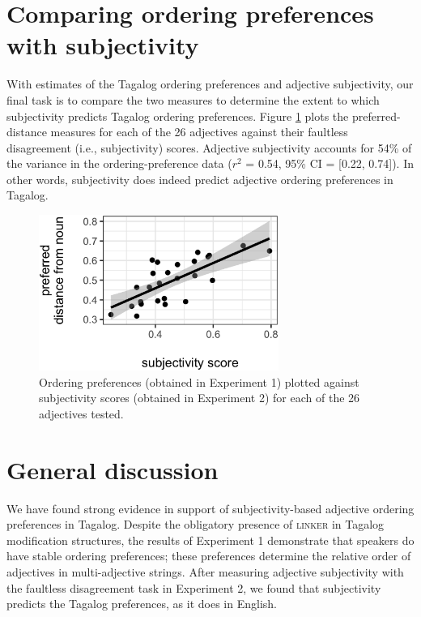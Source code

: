 \documentclass[12pt,letterpaper]{article}
\begin{document}
\section{Comparing ordering preferences with subjectivity} \label{comparison}

With estimates of the Tagalog ordering preferences and adjective subjectivity, our final task is to compare the two measures to determine the extent to which subjectivity predicts Tagalog ordering preferences. Figure \ref{subj-comparison} plots the preferred-distance measures for each of the 26 adjectives against their faultless disagreement (i.e., subjectivity) scores. Adjective subjectivity accounts for 54\% of the variance in the ordering-preference data ($r^2$ = 0.54, 95\% CI = [0.22, 0.74]). In other words, subjectivity does indeed predict adjective ordering preferences in Tagalog.


\begin{figure}[t]
	\centering
	\includegraphics[height=2in]{LSA-naturalness-subjectivity.eps}
	\caption{Ordering preferences (obtained in Experiment 1) plotted against subjectivity scores (obtained in Experiment 2) for each of the 26 adjectives tested. %
	}
	\label{subj-comparison}
\end{figure}


\section{General discussion} \label{discussion}

We have found strong evidence in support of subjectivity-based adjective ordering preferences in Tagalog. Despite the obligatory presence of \textsc{linker} in Tagalog modification structures, the results of Experiment 1 demonstrate that speakers do have stable ordering preferences; these preferences determine the relative order of adjectives in multi-adjective strings. After measuring adjective subjectivity with the faultless disagreement task in Experiment 2, we found that subjectivity predicts the Tagalog preferences, as it does in English. 
\end{document}
